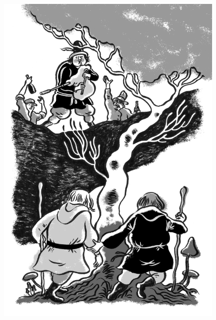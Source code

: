 \begin{figure}%
\vspace*{-1.6cm}
\hspace*{-2cm}\includegraphics[width=140mm]{./imgs/cena1.jpg}
\end{figure}

